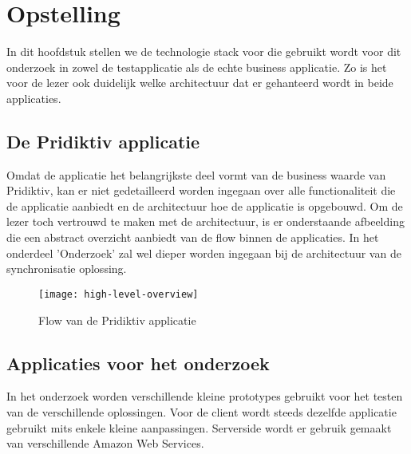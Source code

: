 
\chapter{Opstelling}
\label{ch:setup}

In dit hoofdstuk stellen we de technologie stack voor die gebruikt wordt voor dit onderzoek in zowel de testapplicatie als de echte business applicatie. Zo is het voor de lezer ook duidelijk welke architectuur dat er gehanteerd wordt in beide applicaties. 
\section{De Pridiktiv applicatie}
Omdat de applicatie het belangrijkste deel vormt van de business waarde van Pridiktiv, kan er niet gedetailleerd worden ingegaan over alle functionaliteit die de applicatie aanbiedt en de architectuur hoe de applicatie is opgebouwd. Om de lezer toch vertrouwd te maken met de architectuur, is er onderstaande afbeelding die een abstract overzicht aanbiedt van de flow binnen de applicaties. In het onderdeel 'Onderzoek' zal wel dieper worden ingegaan bij de architectuur van de synchronisatie oplossing.
\begin{figure}[h]
\caption{Flow van de Pridiktiv applicatie}
\centering
\texttt{[image: high-level-overview]}
\end{figure}
\section{Applicaties voor het onderzoek}
 In het onderzoek worden verschillende kleine prototypes gebruikt voor het testen van de verschillende oplossingen. Voor de client wordt steeds dezelfde applicatie gebruikt mits enkele kleine aanpassingen. Serverside wordt er gebruik gemaakt van verschillende Amazon Web Services.
